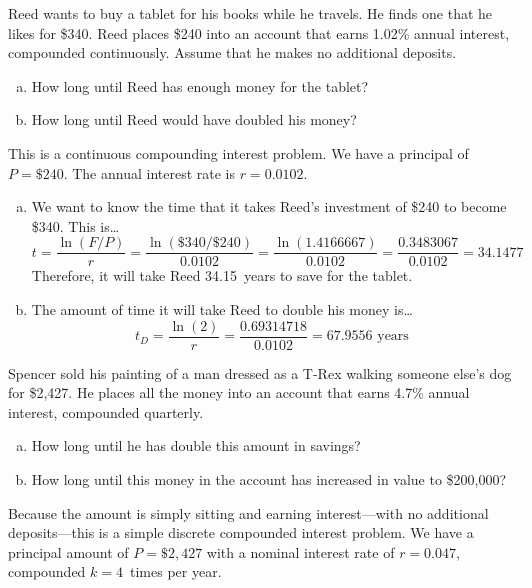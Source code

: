 \documentclass[11pt,letterpaper]{article}
\begin{document}
\newpage



 Reed wants to buy a tablet for his books while he travels. He finds one that he likes for \$340. Reed places \$240 into an account that earns 1.02\% annual interest, compounded continuously. Assume that he makes no additional deposits. 
	\begin{enumerate}[(a)]
	\item How long until Reed has enough money for the tablet?
	\item How long until Reed would have doubled his money?
	\end{enumerate} \pspace

\sol This is a continuous compounding interest problem. We have a principal of $P= \$240$. The annual interest rate is $r= 0.0102$. 

\begin{enumerate}[(a)]
\item We want to know the time that it takes Reed's investment of \$240 to become \$340. This is\dots
	\[
	t= \dfrac{\ln(F/P)}{r}= \dfrac{\ln(\$340/\$240)}{0.0102}= \dfrac{\ln(1.4166667)}{0.0102}= \dfrac{0.3483067}{0.0102}= 34.1477
	\]
Therefore, it will take Reed 34.15~years to save for the tablet. \pspace

\item The amount of time it will take Reed to double his money is\dots
	\[
	t_D= \dfrac{\ln(2)}{r}= \dfrac{0.69314718}{0.0102}= 67.9556 \text{ years}
	\]
\end{enumerate}



\newpage



 Spencer sold his painting of a man dressed as a T-Rex walking someone else's dog for \$2,427. He places all the money into an account that earns 4.7\% annual interest, compounded quarterly. 
	\begin{enumerate}[(a)]
	\item How long until he has double this amount in savings?
	\item How long until this money in the account has increased in value to \$200,000?
	\end{enumerate} \pspace

\sol Because the amount is simply sitting and earning interest---with no additional deposits---this is a simple discrete compounded interest problem. We have a principal amount of $P= \$2,\!427$ with a nominal interest rate of $r= 0.047$, compounded $k= 4$~times per year. 
\end{document}
